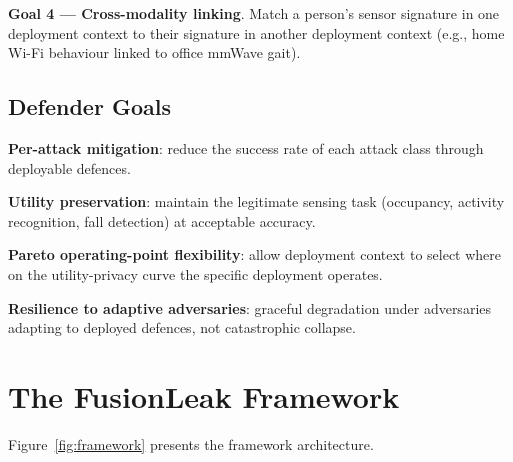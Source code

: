 \documentclass[sigconf,nonacm]{acmart}
\begin{document}
\textbf{Goal 4 --- Cross-modality linking}. Match a person's
sensor signature in one deployment context to their signature
in another deployment context (e.g., home Wi-Fi behaviour
linked to office mmWave gait).

\subsection{Defender Goals}

\textbf{Per-attack mitigation}: reduce the success rate of each
attack class through deployable defences.

\textbf{Utility preservation}: maintain the legitimate sensing
task (occupancy, activity recognition, fall detection) at
acceptable accuracy.

\textbf{Pareto operating-point flexibility}: allow deployment
context to select where on the utility-privacy curve the
specific deployment operates.

\textbf{Resilience to adaptive adversaries}: graceful degradation
under adversaries adapting to deployed defences, not catastrophic
collapse.

\section{The FusionLeak Framework}

Figure~\ref{fig:framework} presents the framework architecture.
\end{document}
